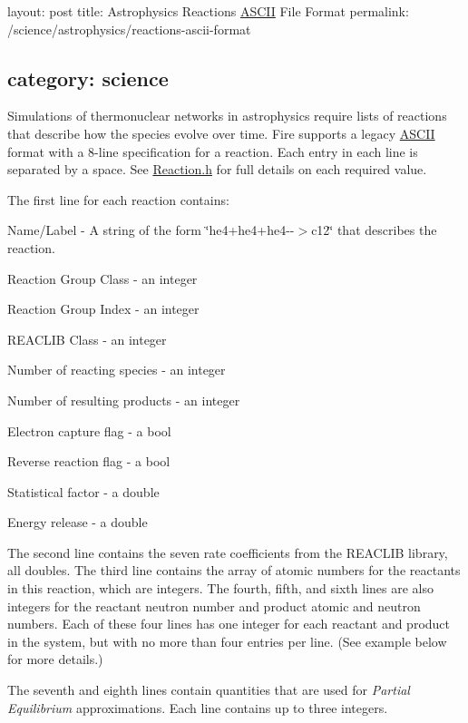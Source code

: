 

 layout\+: post title\+: Astrophysics Reactions \hyperlink{a00038}{A\+S\+C\+II} File Format permalink\+: /science/astrophysics/reactions-\/ascii-\/format \subsection*{category\+: science }

Simulations of thermonuclear networks in astrophysics require lists of reactions that describe how the species evolve over time. Fire supports a legacy \hyperlink{a00038}{A\+S\+C\+II} format with a 8-\/line specification for a reaction. Each entry in each line is separated by a space. See \hyperlink{a00678_source}{Reaction.\+h} for full details on each required value.

The first line for each reaction contains\+:


\begin{DoxyItemize}
\item Name/\+Label -\/ A string of the form \char`\"{}he4+he4+he4-\/-\/$>$c12\char`\"{} that describes the reaction.
\item Reaction Group Class -\/ an integer
\item Reaction Group Index -\/ an integer
\item R\+E\+A\+C\+L\+IB Class -\/ an integer
\item Number of reacting species -\/ an integer
\item Number of resulting products -\/ an integer
\item Electron capture flag -\/ a bool
\item Reverse reaction flag -\/ a bool
\item Statistical factor -\/ a double
\item Energy release -\/ a double
\end{DoxyItemize}

The second line contains the seven rate coefficients from the R\+E\+A\+C\+L\+IB library, all doubles. The third line contains the array of atomic numbers for the reactants in this reaction, which are integers. The fourth, fifth, and sixth lines are also integers for the reactant neutron number and product atomic and neutron numbers. Each of these four lines has one integer for each reactant and product in the system, but with no more than four entries per line. (See example below for more details.)

The seventh and eighth lines contain quantities that are used for {\itshape Partial Equilibrium} approximations. Each line contains up to three integers.


